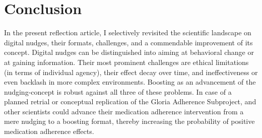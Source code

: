\documentclass[reflection, authordate]{jote-new-article}
\begin{document}
\section{Conclusion}



In the present reflection article, I selectively revisited the scientific landscape on digital nudges, their formats, challenges, and a commendable improvement of its concept. Digital nudges can be distinguished into aiming at behavioral change or at gaining information. Their most prominent challenges are ethical limitations (in terms of individual agency), their effect decay over time, and ineffectiveness or even backlash in more complex environments. Boosting as an advancement of the nudging-concept is robust against all three of these problems. In case of a planned retrial or conceptual replication of the Gloria Adherence Subproject, \textcite{Hartman2021} and other scientists could advance their medication adherence intervention from a mere nudging to a boosting format, thereby increasing the probability of positive medication adherence effects.






\printbibliography
\end{document}
